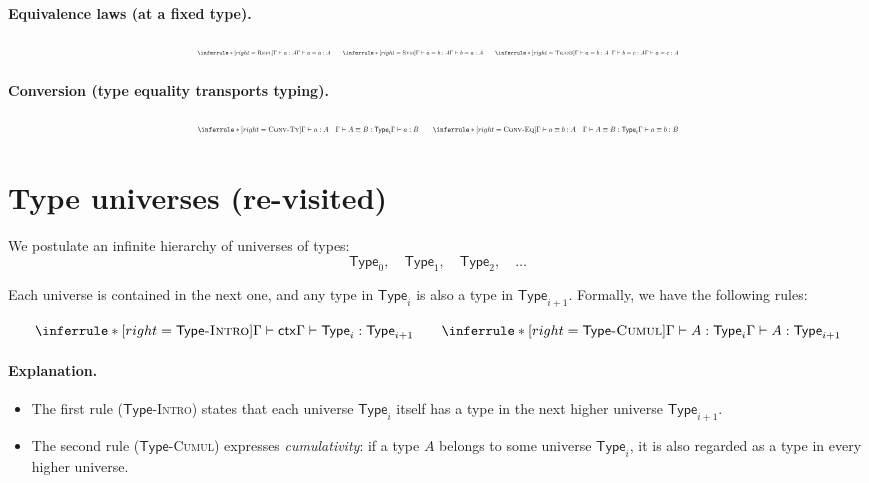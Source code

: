 \documentclass{article}
\newcommand{\Type}{\ensuremath{\mathsf{Type}}}
\newcommand{\ctx}{\mathsf{ctx}}            %
\newcommand{\judg}[3]{#1 \vdash #2 : #3}   %
\newcommand{\jdeq}{\equiv}                 %
\newcommand{\teq}[4]{#1 \vdash #2 \jdeq #3 : #4} %
\newcommand{\rulename}[1]{\textsc{#1}}
\begin{document}
\paragraph{Equivalence laws (at a fixed type).}
\[
\resizebox{\linewidth}{!}{$
\inferrule*[right=\rulename{Refl}]{ \judg{\Gamma}{a}{A} }{ \teq{\Gamma}{a}{a}{A} }
\qquad
\inferrule*[right=\rulename{Sym}]{ \teq{\Gamma}{a}{b}{A} }{ \teq{\Gamma}{b}{a}{A} }
\qquad
\inferrule*[right=\rulename{Trans}]{ \teq{\Gamma}{a}{b}{A} \;\; \teq{\Gamma}{b}{c}{A} }{ \teq{\Gamma}{a}{c}{A} }
$}
\]

\paragraph{Conversion (type equality transports typing).}
\[
\resizebox{\linewidth}{!}{$
\inferrule*[right=\rulename{Conv-Ty}]{
  \judg{\Gamma}{a}{A}
  \quad
  \teq{\Gamma}{A}{B}{\Type_i}
}{
  \judg{\Gamma}{a}{B}
}
\qquad
\inferrule*[right=\rulename{Conv-Eq}]{
  \teq{\Gamma}{a}{b}{A}
  \quad
  \teq{\Gamma}{A}{B}{\Type_i}
}{
  \teq{\Gamma}{a}{b}{B}
}
$}
\]

\section{Type universes (re-visited)}

We postulate an infinite hierarchy of universes of types:
\[
\Type_0, \quad \Type_1, \quad \Type_2, \quad \dots
\]

Each universe is contained in the next one, and any type in \(\Type_i\)
is also a type in \(\Type_{i+1}\).
Formally, we have the following rules:

\[
\inferrule*[right=\rulename{\Type\text{-Intro}}]{
  \Gamma \vdash \ctx
}{
  \judg{\Gamma}{\Type_i}{\Type_{i+1}}
}
\qquad
\inferrule*[right=\rulename{\Type\text{-Cumul}}]{
  \judg{\Gamma}{A}{\Type_i}
}{
  \judg{\Gamma}{A}{\Type_{i+1}}
}
\]

\paragraph{Explanation.}
\begin{itemize}
  \item The first rule (\rulename{\Type-Intro}) states that each universe \(\Type_i\)
  itself has a type in the next higher universe \(\Type_{i+1}\).
  \item The second rule (\rulename{\Type-Cumul}) expresses \emph{cumulativity}:
  if a type \(A\) belongs to some universe \(\Type_i\), it is also regarded
  as a type in every higher universe.
\end{itemize}
\end{document}
